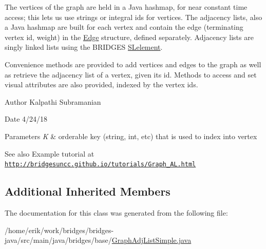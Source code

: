 The vertices of the graph are held in a Java hashmap, for near constant time access; this lets us use strings or integral ids for vertices. The adjacency lists, also a Java hashmap are built for each vertex and contain the edge (terminating vertex id, weight) in the \hyperlink{classbridges_1_1base_1_1_edge}{Edge} structure, defined separately. Adjacency lists are singly linked lists using the B\+R\+I\+D\+G\+ES \hyperlink{classbridges_1_1base_1_1_s_lelement}{S\+Lelement}.

Convenience methods are provided to add vertices and edges to the graph as well as retrieve the adjacency list of a vertex, given its id. Methods to access and set visual attributes are also provided, indexed by the vertex ids.

\begin{DoxyAuthor}{Author}
Kalpathi Subramanian
\end{DoxyAuthor}
\begin{DoxyDate}{Date}
4/24/18
\end{DoxyDate}

\begin{DoxyParams}{Parameters}
{\em K} & orderable key (string, int, etc) that is used to index into vertex\\
\hline
\end{DoxyParams}
\begin{DoxySeeAlso}{See also}
Example tutorial at \href{http://bridgesuncc.github.io/tutorials/Graph_AL.html}{\tt http\+://bridgesuncc.\+github.\+io/tutorials/\+Graph\+\_\+\+A\+L.\+html} 
\end{DoxySeeAlso}
\subsection*{Additional Inherited Members}


The documentation for this class was generated from the following file\+:\begin{DoxyCompactItemize}
\item 
/home/erik/work/bridges/bridges-\/java/src/main/java/bridges/base/\hyperlink{_graph_adj_list_simple_8java}{Graph\+Adj\+List\+Simple.\+java}\end{DoxyCompactItemize}
